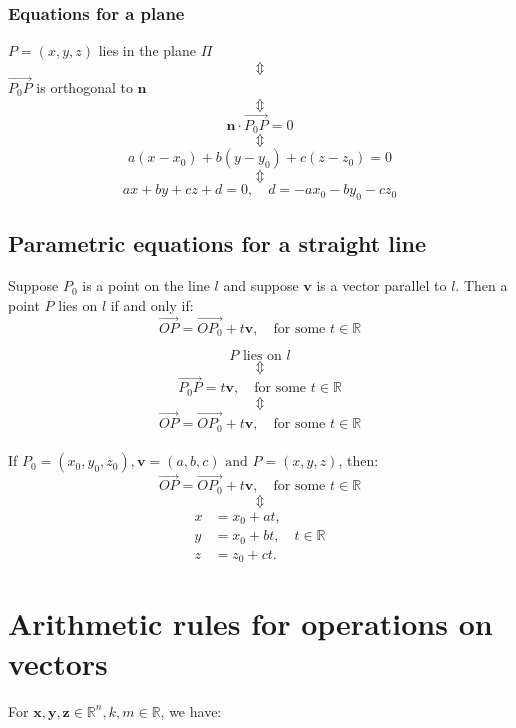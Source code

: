 \documentclass[11pt]{article}
\begin{document}
\subsubsection{Equations for a plane}
\label{sec:org466f07d}
\begin{center}
\(P = (x, y, z)\) lies in the plane \(\Pi\)
\[\Updownarrow\]
\(\overrightarrow{P_0 P}\) is orthogonal to \(\boldsymbol{n}\)
\[\Updownarrow\]
\[\boldsymbol{n} \cdot \overrightarrow{P_0 P} = 0\]
\[\Updownarrow\]
\[a(x - x_0) + b(y - y_0) + c(z - z_0) = 0\]
\[\Updownarrow\]
\[ax + by + cz + d = 0, \quad d = -ax_0 - by_0 - cz_0\]
\end{center}

\newpage

\subsection{Parametric equations for a straight line}
\label{sec:org3a67af2}
Suppose \(P_0\) is a point on the line \(l\) and suppose \(\boldsymbol{v}\) is a vector parallel to \(l\). Then a point \(P\) lies on \(l\) if and only if:
\[\overrightarrow{OP} = \overrightarrow{OP_0} + t \boldsymbol{v}, \quad \text{for some } t \in \mathbb{R}\]

\[P \text{ lies on } l\]
\[\Updownarrow\]
\[\overrightarrow{P_0 P} = t \boldsymbol{v}, \quad \text{for some } t \in \mathbb{R}\]
\[\Updownarrow\]
\[\overrightarrow{OP} = \overrightarrow{OP_0} + t \boldsymbol{v}, \quad \text{for some } t \in \mathbb{R}\]
\\[0pt]

If \(P_0 = (x_0, y_0, z_0), \boldsymbol{v} = (a, b, c) \text{ and } P = (x, y, z)\), then:
\[\overrightarrow{OP} = \overrightarrow{OP_0} + t \boldsymbol{v}, \quad \text{for some } t \in \mathbb{R}\]
\[\Updownarrow\]
\begin{align*}
x &= x_0 + at, \\
y &= x_0 + bt, \quad t \in \mathbb{R} \\
z &= z_0 + ct.
\end{align*}

\section{Arithmetic rules for operations on vectors}
\label{sec:org8ee5f53}
For \(\boldsymbol{x}, \boldsymbol{y}, \boldsymbol{z} \in \mathbb{R}^n, k, m \in \mathbb{R}\), we have:
\end{document}
